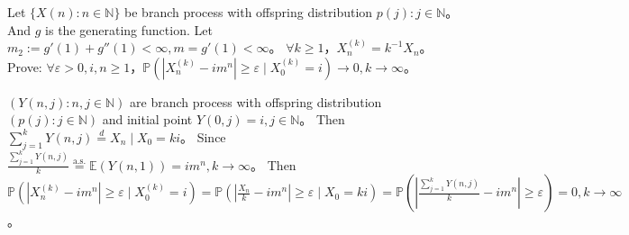 \documentclass{ctexart}
\begin{document}
\begin{problem}\label{pro:3}
  Let \(\{X(n): n \in \mathbb{N}\}\) be branch process with offspring distribution \(p(j): j \in \mathbb{N}\)\nolinebreak[4]。
  And \(g\) is the generating function. Let \(m_2:=g'(1) + g''(1) < \infty,m=g'(1)<\infty\)\nolinebreak[4]。
  \(\forall k \geq 1\)\nolinebreak[4]，\(X_n^{(k)}=k^{-1}X_n\)\nolinebreak[4]。
  Prove: \(\forall \varepsilon >0, i,n \geq 1\)\nolinebreak[4]，\(\mathbb{P}(|X_n^{(k)} -im^n| \geq \varepsilon \mid X_0^{(k)}=i) \to 0, k \to \infty\)\nolinebreak[4]。
\end{problem}
\begin{solution}
  \((Y(n,j):n,j \in \mathbb{N})\) are branch process with offspring distribution \((p(j):j \in \mathbb{N})\)
  and initial point \(Y(0,j)=i,j \in \mathbb{N}\)\nolinebreak[4]。
  Then \(\sum_{j=1}^{k} Y(n,j) \overset{d}{=} X_n \mid X_0=ki\)\nolinebreak[4]。
  Since \(\frac{\sum_{j=1}^{k} Y(n,j)}{k} \overset{\text{a.s.}}{=} \mathbb{E}(Y(n,1))=im^n ,k \to \infty\)\nolinebreak[4]。
  Then \(\mathbb{P}(|X_n^{(k)}-im^n| \geq \varepsilon \mid X_0^{(k)}=i)=\mathbb{P}(|\frac{X_n}{k}-im^n|\geq  \varepsilon \mid X_0=ki)=\mathbb{P}(|\frac{\sum_{j=1}^{k} Y(n,j)}{k}-im^n| \geq \varepsilon)=0, k \to \infty\)\nolinebreak[4]。
\end{solution}
\end{document}
